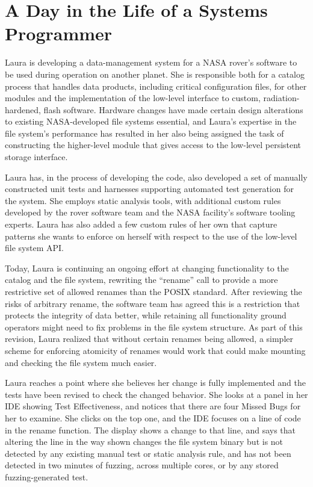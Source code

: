 \section{A Day in the Life of a Systems Programmer}

Laura is developing a data-management system for a NASA rover's software to be used during operation on another planet.  She is responsible both for a catalog process that handles data products, including critical configuration files, for other modules and the implementation of the low-level interface to custom, radiation-hardened, flash software.  Hardware changes have made certain design alterations to existing NASA-developed file systems essential, and Laura's expertise in the file system's performance has resulted in her also being assigned the task of constructing the higher-level module that gives access to the low-level persistent storage interface.

Laura has, in the process of developing the code, also developed a set of manually constructed unit tests and harnesses supporting automated test generation for the system.  She employs static analysis tools, with additional custom rules developed by the rover software team and the NASA facility's software tooling experts.  Laura has also added a few custom rules of her own that capture patterns she wants to enforce on herself with respect to the use of the low-level file system API.

Today, Laura is continuing an ongoing effort at changing functionality to the catalog and the file system, rewriting the ``rename'' call to provide a more restrictive set of allowed renames than the POSIX standard.  After reviewing the risks of arbitrary rename, the software team has agreed this is a restriction that protects the integrity of data better, while retaining all functionality ground operators might need to fix problems in the file system structure.  As part of this revision, Laura realized that without certain renames being allowed, a simpler scheme for enforcing atomicity of renames would work that could make mounting and checking the file system much easier.

Laura reaches a point where she believes her change is fully implemented and the tests have been revised to check the changed behavior.  She looks at a panel in her IDE showing Test Effectiveness, and notices that there are four Missed Bugs for her to examine.  She clicks on the top one, and the IDE focuses on a line of code in the rename function.  The display shows a change to that line, and says that altering the line in the way shown changes the file system binary but is not detected by any existing manual test or static analysis rule, and has not been detected in two minutes of fuzzing, across multiple cores, or by any stored fuzzing-generated test.

